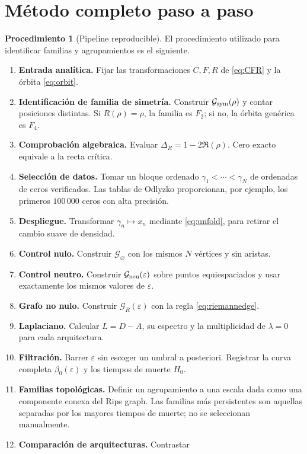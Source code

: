 \documentclass[11pt]{amsart}
\theoremstyle{definition}
\newtheorem{algorithmicdef}[theorem]{Procedimiento}
\theoremstyle{remark}
\begin{document}
\section{Método completo paso a paso}
\begin{algorithmicdef}[Pipeline reproducible]
El procedimiento utilizado para identificar familias y agrupamientos es el siguiente.
\begin{enumerate}[label=\textbf{Paso \arabic*.},leftmargin=*]
\item \textbf{Entrada analítica.} Fijar las transformaciones $C,F,R$ de \eqref{eq:CFR} y la órbita \eqref{eq:orbit}.
\item \textbf{Identificación de familia de simetría.} Construir $\mathcal G_{\rm sym}(\rho)$ y contar posiciones distintas. Si $R(\rho)=\rho$, la familia es $F_2$; si no, la órbita genérica es $F_4$.
\item \textbf{Comprobación algebraica.} Evaluar $\Delta_R=1-2\Re(\rho)$. Cero exacto equivale a la recta crítica.
\item \textbf{Selección de datos.} Tomar un bloque ordenado $\gamma_1<\cdots<\gamma_N$ de ordenadas de ceros verificados. Las tablas de Odlyzko proporcionan, por ejemplo, los primeros $100\,000$ ceros con alta precisión.
\item \textbf{Despliegue.} Transformar $\gamma_n\mapsto x_n$ mediante \eqref{eq:unfold}, para retirar el cambio suave de densidad.
\item \textbf{Control nulo.} Construir $\mathcal G_{\varnothing}$ con los mismos $N$ vértices y sin aristas.
\item \textbf{Control neutro.} Construir $\mathcal G_{\rm neu}(\varepsilon)$ sobre puntos equiespaciados y usar exactamente los mismos valores de $\varepsilon$.
\item \textbf{Grafo no nulo.} Construir $\mathcal G_R(\varepsilon)$ con la regla \eqref{eq:riemannedge}.
\item \textbf{Laplaciano.} Calcular $L=D-A$, su espectro y la multiplicidad de $\lambda=0$ para cada arquitectura.
\item \textbf{Filtración.} Barrer $\varepsilon$ sin escoger un umbral a posteriori. Registrar la curva completa $\beta_0(\varepsilon)$ y los tiempos de muerte $H_0$.
\item \textbf{Familias topológicas.} Definir un agrupamiento a una escala dada como una componente conexa del Rips graph. Las familias más persistentes son aquellas separadas por los mayores tiempos de muerte; no se seleccionan manualmente.
\item \textbf{Comparación de arquitecturas.} Contrastar

\end{enumerate}
\end{algorithmicdef}
\end{document}
